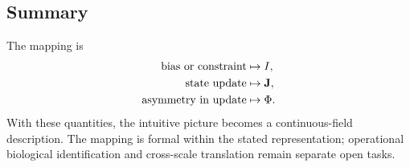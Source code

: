 \subsection{Summary}

The mapping is
\begin{align}
  \text{bias or constraint} &\mapsto I,\\
  \text{state update} &\mapsto \mathbf{J},\\
  \text{asymmetry in update} &\mapsto \Phi.
\end{align}
With these quantities, the intuitive picture becomes a continuous-field description. The mapping is formal within the stated representation; operational biological identification and cross-scale translation remain separate open tasks.
